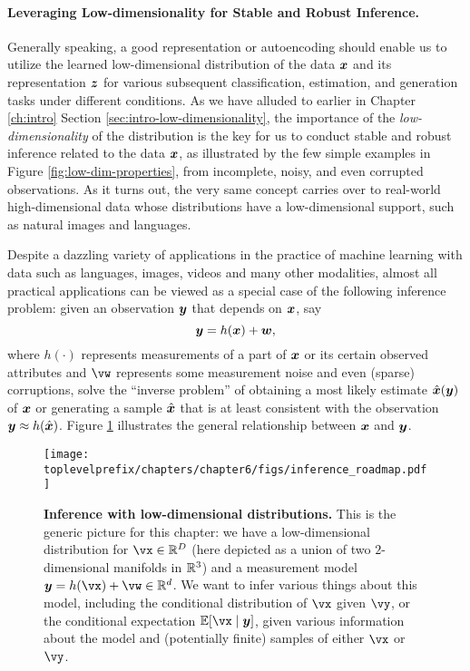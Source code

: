 \documentclass[../../book-main.tex]{subfiles}
\begin{document}
\paragraph{Leveraging Low-dimensionality for Stable and Robust Inference.}
Generally speaking, a good representation or autoencoding should enable us to utilize the learned low-dimensional distribution of the data $\bm{x}$ and its representation $\bm{z}$ for various subsequent classification, estimation, and generation tasks under different conditions. As we have alluded to earlier in Chapter \ref{ch:intro} Section \ref{sec:intro-low-dimensionality}, the importance of the {\em low-dimensionality} of the distribution is the key for us to conduct stable and robust inference related to the data $\bm{x}$, as illustrated by the few simple examples in Figure \ref{fig:low-dim-properties}, from incomplete, noisy, and even corrupted observations. As it turns out, the very same concept carries over to real-world high-dimensional data whose distributions have a low-dimensional support, such as natural images and languages. 

Despite a dazzling variety of applications in the practice of machine learning with data such as languages, images, videos and many other modalities, almost all practical applications can be viewed as a special case of the following inference problem: given an observation $\bm{y}$ that depends on $\bm{x}$, say
\begin{equation}
    \bm{y} = h(\bm{x}) + \boldsymbol{w},
\end{equation}
where $h(\cdot)$ represents measurements of a part of $\bm{x}$ or its certain observed attributes and $\vw$ represents some measurement noise and even (sparse) corruptions, solve the ``inverse problem'' of obtaining a most likely estimate $\hat {\bm{x}}(\bm{y})$ of $\bm{x}$ or generating a sample $\hat{\bm{x}}$ that is at least consistent with the observation $\bm{y} \approx h(\hat{\bm{x}})$. Figure \ref{fig:inference_roadmap} illustrates the general relationship between $\bm{x}$ and $\bm{y}$. 

\begin{figure}
  \centering 
  \texttt{[image: \\toplevelprefix/chapters/chapter6/figs/inference\_roadmap.pdf]}
  \caption{\small \textbf{Inference with low-dimensional distributions.} This is the generic picture for this chapter: we have a low-dimensional distribution for \(\vx \in \R^{D}\) (here depicted as a union of two \(2\)-dimensional manifolds in \(\mathbb{R}^{3}\)) and a measurement model \(\y = h(\vx) + \vw \in \R^{d}\). We want to infer various things about this model, including the conditional distribution of \(\vx\) given \(\vy\), or the conditional expectation \(\mathbb{E}[\vx \mid \y]\), given various information about the model and (potentially finite) samples of either \(\vx\) or \(\vy\).}
  \label{fig:inference_roadmap}
\end{figure}
\end{document}
